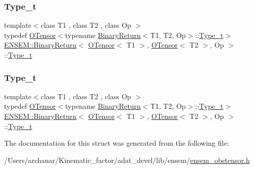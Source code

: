 \subsubsection{\texorpdfstring{Type\_t}{Type\_t}\hspace{0.1cm}{\footnotesize\ttfamily [1/2]}}
{\footnotesize\ttfamily template$<$class T1 , class T2 , class Op $>$ \\
typedef \mbox{\hyperlink{classENSEM_1_1OTensor}{O\+Tensor}}$<$typename \mbox{\hyperlink{structENSEM_1_1BinaryReturn}{Binary\+Return}}$<$T1, T2, Op$>$\+::\mbox{\hyperlink{structENSEM_1_1BinaryReturn_3_01OTensor_3_01T1_01_4_00_01OTensor_3_01T2_01_4_00_01Op_01_4_a668298286c843e5bab2f6b4143669da5}{Type\+\_\+t}}$>$ \mbox{\hyperlink{structENSEM_1_1BinaryReturn}{E\+N\+S\+E\+M\+::\+Binary\+Return}}$<$ \mbox{\hyperlink{classENSEM_1_1OTensor}{O\+Tensor}}$<$ T1 $>$, \mbox{\hyperlink{classENSEM_1_1OTensor}{O\+Tensor}}$<$ T2 $>$, Op $>$\+::\mbox{\hyperlink{structENSEM_1_1BinaryReturn_3_01OTensor_3_01T1_01_4_00_01OTensor_3_01T2_01_4_00_01Op_01_4_a668298286c843e5bab2f6b4143669da5}{Type\+\_\+t}}}

\mbox{\label{structENSEM_1_1BinaryReturn_3_01OTensor_3_01T1_01_4_00_01OTensor_3_01T2_01_4_00_01Op_01_4_a668298286c843e5bab2f6b4143669da5}} 
\subsubsection{\texorpdfstring{Type\_t}{Type\_t}\hspace{0.1cm}{\footnotesize\ttfamily [2/2]}}
{\footnotesize\ttfamily template$<$class T1 , class T2 , class Op $>$ \\
typedef \mbox{\hyperlink{classENSEM_1_1OTensor}{O\+Tensor}}$<$typename \mbox{\hyperlink{structENSEM_1_1BinaryReturn}{Binary\+Return}}$<$T1, T2, Op$>$\+::\mbox{\hyperlink{structENSEM_1_1BinaryReturn_3_01OTensor_3_01T1_01_4_00_01OTensor_3_01T2_01_4_00_01Op_01_4_a668298286c843e5bab2f6b4143669da5}{Type\+\_\+t}}$>$ \mbox{\hyperlink{structENSEM_1_1BinaryReturn}{E\+N\+S\+E\+M\+::\+Binary\+Return}}$<$ \mbox{\hyperlink{classENSEM_1_1OTensor}{O\+Tensor}}$<$ T1 $>$, \mbox{\hyperlink{classENSEM_1_1OTensor}{O\+Tensor}}$<$ T2 $>$, Op $>$\+::\mbox{\hyperlink{structENSEM_1_1BinaryReturn_3_01OTensor_3_01T1_01_4_00_01OTensor_3_01T2_01_4_00_01Op_01_4_a668298286c843e5bab2f6b4143669da5}{Type\+\_\+t}}}



The documentation for this struct was generated from the following file\+:\begin{DoxyCompactItemize}
\item 
/\+Users/archanar/\+Kinematic\+\_\+factor/adat\+\_\+devel/lib/ensem/\mbox{\hyperlink{lib_2ensem_2ensem__obstensor_8h}{ensem\+\_\+obstensor.\+h}}\end{DoxyCompactItemize}
